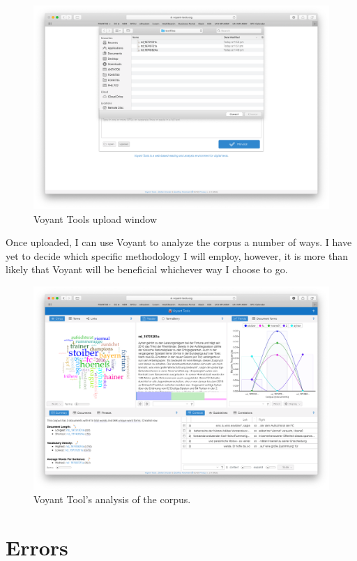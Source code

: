 \documentclass{article}
\begin{document}
\begin{figure}[h!]
    \centering
    \includegraphics[scale=0.15]{voyantupload.png}
    \caption{Voyant Tools upload window}
    \label{fig:my_label}
\end{figure}

Once uploaded, I can use Voyant to analyze the corpus a number of ways. I have yet to decide which specific methodology I will employ, however, it is more than likely that Voyant will be beneficial whichever way I choose to go.

\begin{figure}[h!]
    \centering
    \includegraphics[width=\textwidth]{voyantresult.png}
    \caption{Voyant Tool's analysis of the corpus.}
    \label{fig:my_label}
\end{figure}

\section*{Errors}
\end{document}
